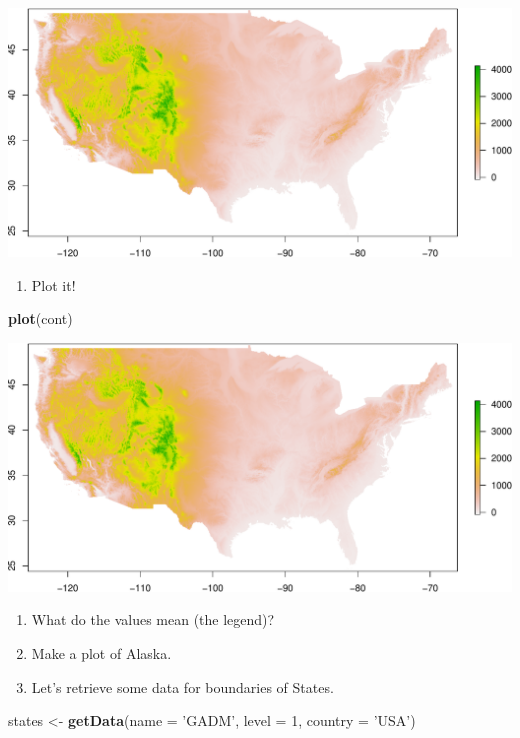 \documentclass[
]{book}
\newenvironment{Shaded}{\begin{snugshade}}{\end{snugshade}}
\newcommand{\DataTypeTok}[1]{\textcolor[rgb]{0.13,0.29,0.53}{#1}}
\newcommand{\DecValTok}[1]{\textcolor[rgb]{0.00,0.00,0.81}{#1}}
\newcommand{\KeywordTok}[1]{\textcolor[rgb]{0.13,0.29,0.53}{\textbf{#1}}}
\newcommand{\NormalTok}[1]{#1}
\newcommand{\StringTok}[1]{\textcolor[rgb]{0.31,0.60,0.02}{#1}}
\providecommand{\tightlist}{%
  \setlength{\itemsep}{0pt}\setlength{\parskip}{0pt}}
\begin{document}
\includegraphics{figures/unnamed-chunk-553-1.pdf}

\begin{enumerate}
\def\labelenumi{\arabic{enumi}.}
\setcounter{enumi}{6}
\tightlist
\item
  Plot it!
\end{enumerate}

\begin{Shaded}
\begin{Highlighting}[]
\KeywordTok{plot}\NormalTok{(cont)}
\end{Highlighting}
\end{Shaded}

\includegraphics{figures/unnamed-chunk-554-1.pdf}

\begin{enumerate}
\def\labelenumi{\arabic{enumi}.}
\setcounter{enumi}{7}
\item
  What do the values mean (the legend)?
\item
  Make a plot of Alaska.
\item
  Let's retrieve some data for boundaries of States.
\end{enumerate}

\begin{Shaded}
\begin{Highlighting}[]
\NormalTok{states <-}\StringTok{ }\KeywordTok{getData}\NormalTok{(}\DataTypeTok{name =} \StringTok{'GADM'}\NormalTok{, }\DataTypeTok{level =} \DecValTok{1}\NormalTok{, }\DataTypeTok{country =} \StringTok{'USA'}\NormalTok{)}
\end{Highlighting}
\end{Shaded}
\end{document}
